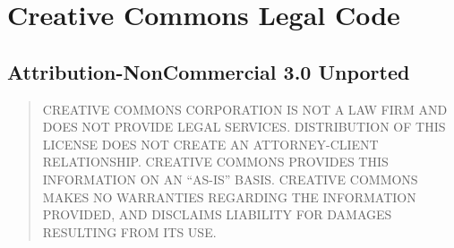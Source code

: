 \section{Creative Commons Legal Code}

\subsection{Attribution-NonCommercial 3.0 Unported}





\begin{quotation}
CREATIVE COMMONS CORPORATION IS NOT A LAW FIRM AND DOES
NOT PROVIDE LEGAL SERVICES. DISTRIBUTION OF THIS LICENSE
DOES NOT CREATE AN ATTORNEY-CLIENT RELATIONSHIP. CREATIVE
COMMONS PROVIDES THIS INFORMATION ON AN ``AS-IS'' BASIS.
CREATIVE COMMONS MAKES NO WARRANTIES REGARDING THE
INFORMATION PROVIDED, AND DISCLAIMS LIABILITY FOR DAMAGES
RESULTING FROM ITS USE.
\end{quotation}
